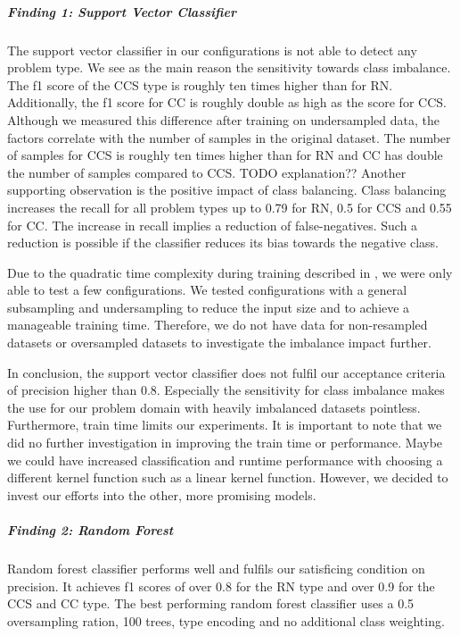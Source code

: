 \subparagraph{Finding 1: Support Vector Classifier}
The support vector classifier in our configurations is not able to detect any problem type. We see as the main reason the sensitivity towards class imbalance. The  f1 score of the CCS type is roughly ten times higher than for RN. Additionally, the f1 score for CC is roughly double as high as the score for CCS. Although we measured this difference after training on undersampled data, the factors correlate with the number of samples in the original dataset. The number of samples for CCS is roughly ten times higher than for RN and CC has double the number of samples compared to CCS. TODO explanation??
Another supporting observation is the positive impact of class balancing. Class balancing increases the recall for all problem types up to 0.79 for RN, 0.5 for CCS and 0.55 for CC. The increase in recall implies a reduction of false-negatives. Such a reduction is possible if the classifier reduces its bias towards the negative class. 

Due to the quadratic time complexity during training described in , we were only able to test a few configurations. We tested configurations with a general subsampling and undersampling to reduce the input size and to achieve a manageable training time. Therefore, we do not have data for non-resampled datasets or oversampled datasets to investigate the imbalance impact further.

In conclusion, the support vector classifier does not fulfil our acceptance criteria of precision higher than 0.8. Especially the sensitivity for class imbalance makes the use for our problem domain with heavily imbalanced datasets pointless.  
Furthermore, train time limits our experiments. It is important to note that we did no further investigation in improving the train time or performance. Maybe we could have increased classification and runtime performance with choosing a different kernel function such as a linear kernel function. However, we decided to invest our efforts into the other, more promising models. 

\subparagraph{Finding 2: Random Forest}
Random forest classifier performs well and fulfils our satisficing condition on precision. It achieves f1 scores of over 0.8 for the RN type and over 0.9 for the CCS and CC type.
The best performing random forest classifier uses a 0.5 oversampling ration, 100 trees, type encoding and no additional class weighting.



